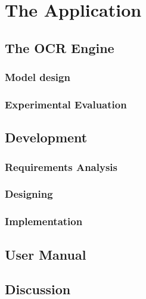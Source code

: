 \chapter{The Application}
\label{chap:application}
\section{The OCR Engine}
\subsection{Model design}
\subsection{Experimental Evaluation}
\section{Development}
\subsection{Requirements Analysis}
\subsection{Designing}
\subsection{Implementation}
\section{User Manual}
\section{Discussion}